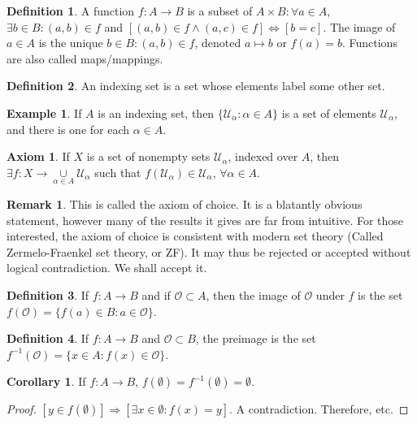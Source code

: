\documentclass[oneside]{book}
\theoremstyle{definition}
\newtheorem{definition}{Definition}[section]
\newtheorem{corollary}{Corollary}[section]
\newtheorem{example}{Example}[section]
\newtheorem{remark}{Remark}[section]
\newtheorem{axiom}{Axiom}[section]
\begin{document}
\begin{definition}
A function $f:A\rightarrow B$ is a subset of $A\times B: \forall a\in A$, $\exists b\in B: (a,b)\in f$ and $[(a,b)\in f\land (a,c)\in f]\Leftrightarrow [b=c]$. The image of $a\in A$ is the unique $b\in B:(a,b)\in f$, denoted $a\mapsto b$ or $f(a)=b$. Functions are also called maps/mappings.
\end{definition}

\begin{definition}
An indexing set is a set whose elements label some other set.
\end{definition}

\begin{example}
If $A$ is an indexing set, then $\{\mathcal{U}_{\alpha}:\alpha \in A\}$ is a set of elements $\mathcal{U}_{\alpha}$, and there is one for each $\alpha \in A$.
\end{example}

\begin{axiom}
If $X$ is a set of nonempty sets $\mathcal{U}_{\alpha}$, indexed over $A$, then $\exists f:X\rightarrow \underset{\alpha \in A}\cup \mathcal{U}_{\alpha}$ such that $f(\mathcal{U}_{\alpha}) \in \mathcal{U}_{\alpha}$, $\forall \alpha\in A$.
\end{axiom}

\begin{remark}
This is called the axiom of choice. It is a blatantly obvious statement, however many of the results it gives are far from intuitive. For those interested, the axiom of choice is consistent with modern set theory (Called Zermelo-Fraenkel set theory, or ZF). It may thus be rejected or accepted without logical contradiction. We shall accept it.
\end{remark}

\begin{definition}
If $f:A\rightarrow B$ and if $\mathcal{O}\subset A$, then the image of $\mathcal{O}$ under $f$ is the set $f(\mathcal{O}) = \{f(a)\in B:a\in \mathcal{O}\}$.
\end{definition}

\begin{definition}
If $f:A\rightarrow B$ and $\mathscr{O}\subset B$, the preimage is the set $f^{-1}(\mathscr{O}) = \{x\in A:f(x)\in \mathscr{O}\}$.
\end{definition}

\begin{corollary}
If $f:A\rightarrow B$, $f(\emptyset) = f^{-1}(\emptyset) = \emptyset$.
\end{corollary}
\begin{proof}
$[y\in f(\emptyset)]\Rightarrow [\exists x\in \emptyset:f(x)=y]$. A contradiction. Therefore, etc.
\end{proof}
\end{document}

